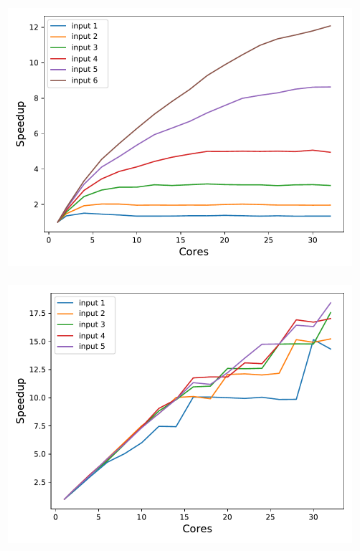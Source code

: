 \begin{figure}[H]
	\begin{subfigure}[b]{0.45\textwidth}
		\includegraphics[width=\textwidth]{pascalanalyzer/figures/results/speedup_completo_rtview_2 (1).pdf}
		\label{fig:speedup_raytrace}
	\end{subfigure}
	\begin{subfigure}[b]{0.45\textwidth}
		\includegraphics[width=\textwidth]{pascalanalyzer/figures/results/speedup_completo_openmc_kernel_novo (1).pdf}
		\label{fig:speedup_openmc}
	\end{subfigure}
	\caption{}
	\label{fig:speedup}
\end{figure}
